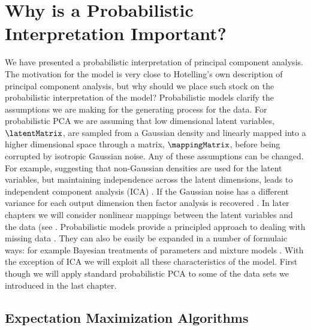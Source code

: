 \section{Why is a Probabilistic Interpretation Important?}

We have presented a probabilistic interpretation of principal
component analysis. The motivation for the model is very close to
Hotelling's own description of principal component analysis, but why
should we place such stock on the probabilistic interpretation of the
model? Probabilistic models clarify the assumptions we are making for
the generating process for the data. For probabilistic PCA we are
assuming that low dimensional latent variables, $\latentMatrix$, are
sampled from a Gaussian density and linearly mapped into a higher
dimensional space through a matrix, $\mappingMatrix$, before being
corrupted by isotropic Gaussian noise. Any of these assumptions can be
changed. For example, suggesting that non-Gaussian densities are used
for the latent variables, but maintaining independence across the
latent dimensions, leads to independent component
analysis (ICA)
\citep{MacKay:ica96,Hyvarinen:icabook01}. If the Gaussian noise has a
different variance for each output dimension then factor
analysis is recovered
\citep{Roweis:unifying}. In later chapters we will consider nonlinear
mappings between the latent variables and the data (see
. Probabilistic models provide a
principled approach to dealing with missing data
\citep{Tipping:probpca99}. They can also be easily be expanded in a
number of formulaic ways: for example Bayesian treatments of
parameters \citep{Bishop:bayesPCA98,Bishop:icann99,Minka:automatic01}
and mixture models
\citep{Tipping:pca97,Ghahramani:emmixtures97,Ghahramani:bfa00}. With
the exception of ICA we will exploit all these characteristics of the
model. First though we will apply standard probabilistic
PCA to some of the data sets we
introduced in the last chapter.

\subsection{Expectation Maximization Algorithms}

